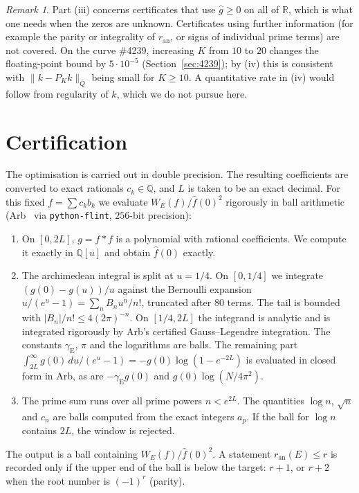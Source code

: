 \documentclass[11pt]{amsart}
\theoremstyle{remark}
\newtheorem{remark}[theorem]{Remark}
\theoremstyle{definition}
\newcommand{\Q}{\mathbb{Q}}
\newcommand{\R}{\mathbb{R}}
\newcommand{\ran}{r_{\mathrm{an}}}
\begin{document}
\begin{remark}
Part (iii) concerns certificates that use $\hat g\ge0$ on all of $\R$, which is what one needs when the zeros are unknown.
Certificates using further information (for example the parity or integrality of $\ran$, or signs of individual prime
terms) are not covered. On the curve \#4239, increasing $K$ from $10$ to $20$ changes the floating-point bound by $5\cdot10^{-5}$ (Section~\ref{sec:4239}); by (iv) this is consistent with $\|k-P_Kk\|_Q$ being small
for $K\ge10$. A quantitative rate in (iv) would follow from regularity of $k$, which we do not pursue here.
\end{remark}

\section{Certification}\label{sec:cert}

The optimisation is carried out in double precision. The resulting coefficients are converted to exact rationals $c_k\in\Q$, and $L$ is taken to be an exact decimal. For this fixed $f=\sum c_k b_k$ we evaluate $W_E(f)/\hat f(0)^2$ rigorously in ball arithmetic (Arb~\cite{Arb} via \texttt{python-flint}, $256$-bit precision):
\begin{enumerate}
\item On $[0,2L]$, $g=f*f$ is a polynomial with rational coefficients. We compute it exactly in $\Q[u]$ and obtain $\hat f(0)$ exactly.
\item The archimedean integral is split at $u=1/4$. On $[0,1/4]$ we integrate $(g(0)-g(u))/u$ against the Bernoulli expansion $u/(e^u-1)=\sum_n B_n u^n/n!$, truncated after $80$ terms. The tail is bounded with $|B_n|/n!\le 4(2\pi)^{-n}$. On $[1/4,2L]$ the integrand is analytic and is integrated rigorously by Arb's certified Gauss--Legendre integration. The constants $\gamma_{\mathrm E}$, $\pi$ and the logarithms are balls. The remaining part $\int_{2L}^\infty g(0)\,du/(e^u-1)=-g(0)\log(1-e^{-2L})$ is evaluated in closed form in Arb, as are $-\gamma_{\mathrm E}g(0)$ and $g(0)\log(N/4\pi^2)$.
\item The prime sum runs over all prime powers $n<e^{2L}$. The quantities $\log n$, $\sqrt n$ and $c_n$ are balls computed from the exact integers $a_p$. If the ball for $\log n$ contains $2L$, the window is rejected.
\end{enumerate}
The output is a ball containing $W_E(f)/\hat f(0)^2$. A statement $\ran(E)\le r$ is recorded only if the upper end of the ball is below the target: $r+1$, or $r+2$ when the root number is $(-1)^r$ (parity).
\end{document}
